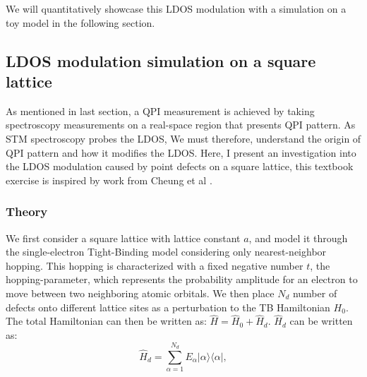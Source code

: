 We will quantitatively showcase this \ac{LDOS} modulation with a simulation on a toy model in the following section. 


\subsection{LDOS modulation simulation on a square lattice}

As mentioned in last section, a \ac{QPI} measurement is achieved by taking spectroscopy measurements on a real-space region that presents QPI pattern. As \ac{STM} spectroscopy probes the \ac{LDOS}, We must therefore, understand the origin of \ac{QPI} pattern and how it modifies the \ac{LDOS}. Here, I present an investigation into the \ac{LDOS} modulation caused by point defects on a square lattice, this textbook exercise is inspired by work from Cheung et al \cite{cheungDictionaryLearningFouriertransform2020}.

\subsubsection{Theory}
We first consider a square lattice with lattice constant $a$, and model it through the single-electron Tight-Binding model considering only nearest-neighbor hopping. This hopping is characterized with a fixed negative number $t$, the hopping-parameter, which represents the probability amplitude for an electron to move between two neighboring atomic orbitals. We then place $N_d$ number of defects onto different lattice sites as a perturbation to the \ac{TB} Hamiltonian $H_0$. The total Hamiltonian can then be written as: 
$\hat{H} = \hat{H}_0 + \hat{H}_d$. $\hat{H}_d$ can be written as: 
\begin{equation}
\label{eq:defect_hamiltonian}
\hat{H}_d = \sum_{\alpha=1}^{N_d} E_\alpha \lvert \alpha \rangle \langle \alpha \rvert,	
\end{equation}

